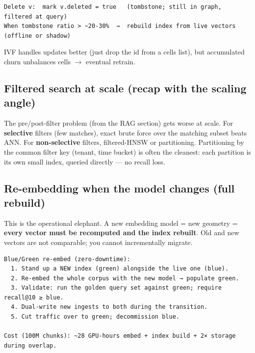\documentclass[11pt]{article}
\begin{document}
\setcodelang{}

\begin{verbatim}
Delete v:  mark v.deleted = true   (tombstone; still in graph, filtered at query)
When tombstone ratio > ~20-30%  →  rebuild index from live vectors  (offline or shadow)
\end{verbatim}

IVF handles updates better (just drop the id from a cell\textquotesingle s list), but accumulated churn unbalances cells \(\rightarrow\) eventual retrain.

\subsection{Filtered search at scale (recap with the scaling angle)}\label{filtered-search-at-scale-recap-with-the-scaling-angle}

The pre/post-filter problem (from the RAG section) gets worse at scale. For \textbf{selective} filters (few matches), exact brute force over the matching subset beats ANN. For \textbf{non-selective} filters, filtered-HNSW or partitioning. Partitioning by the common filter key (tenant, time bucket) is often the cleanest: each partition is its own small index, queried directly --- no recall loss.

\subsection{Re-embedding when the model changes (full rebuild)}\label{re-embedding-when-the-model-changes-full-rebuild}

This is the operational elephant. A new embedding model = new geometry = \textbf{every vector must be recomputed and the index rebuilt}. Old and new vectors are not comparable; you cannot incrementally migrate.

\setcodelang{}

\begin{verbatim}
Blue/Green re-embed (zero-downtime):
  1. Stand up a NEW index (green) alongside the live one (blue).
  2. Re-embed the whole corpus with the new model → populate green.
  3. Validate: run the golden query set against green; require recall@10 ≥ blue.
  4. Dual-write new ingests to both during the transition.
  5. Cut traffic over to green; decommission blue.

Cost (100M chunks): ~28 GPU-hours embed + index build + 2× storage during overlap.
\end{verbatim}
\end{document}
